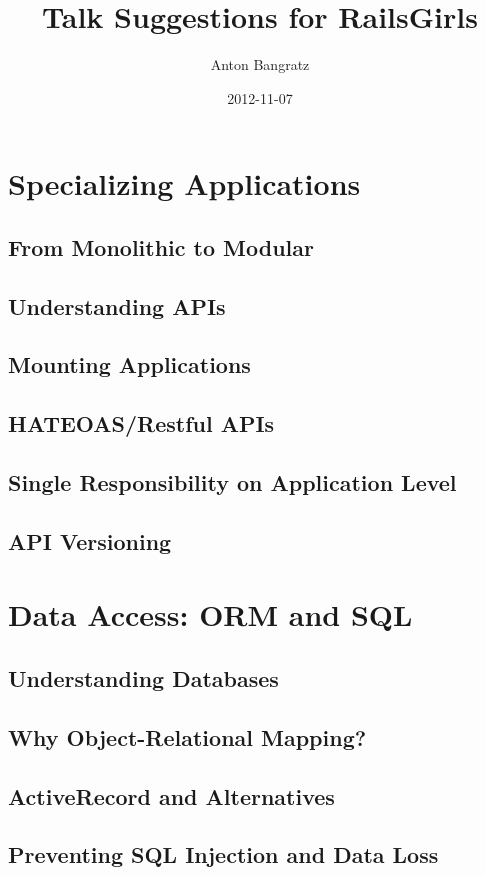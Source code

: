 \documentclass[a4paper]{article}
\begin{document}
\title{Talk Suggestions for RailsGirls}
\author{Anton Bangratz}
\date{2012-11-07}
\setcounter{tocdepth}{2}
\maketitle
\tableofcontents
\section{Specializing Applications}
\subsection{From Monolithic to Modular}
\subsection{Understanding APIs}
\subsection{Mounting Applications}
\subsection{HATEOAS/Restful APIs}
\subsection{Single Responsibility on Application Level}
\subsection{API Versioning}
\newpage
\section{Data Access: ORM and SQL}
\subsection{Understanding Databases}
\subsection{Why Object-Relational Mapping?}
\subsection{ActiveRecord and Alternatives}
\subsection{Preventing SQL Injection and Data Loss}
\end{document}
